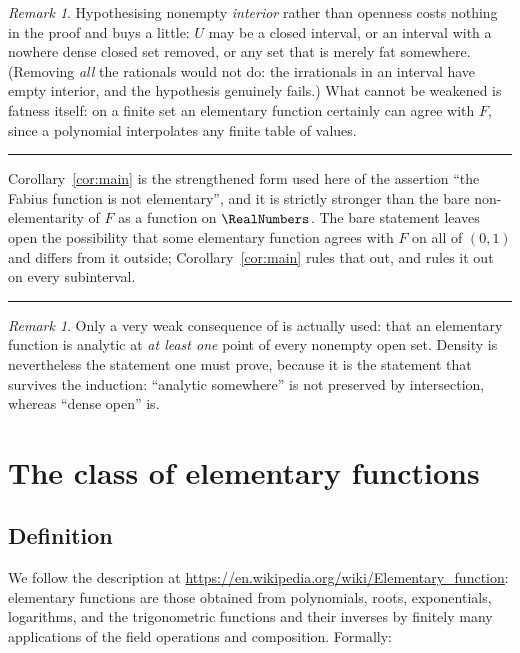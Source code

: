 \documentclass[11pt,oneside]{article}
\theoremstyle{definition}
\theoremstyle{remark}
\newtheorem{remark}[theorem]{Remark}
\newenvironment{boxedremark}{%
  \par\smallskip\noindent\begin{center}\begin{minipage}{0.94\textwidth}%
  \color{black}\hrule\vspace{0.6em}\small
}{%
  \vspace{0.6em}\hrule\end{minipage}\end{center}\smallskip
}
\begin{document}
\begin{remark}
Hypothesising nonempty \emph{interior} rather than openness costs nothing in
the proof and buys a little: $U$ may be a closed interval, or an interval with
a nowhere dense closed set removed, or any set that is merely fat somewhere.
(Removing \emph{all} the rationals would not do: the irrationals in an
interval have empty interior, and the hypothesis genuinely fails.)
What cannot be weakened is fatness itself: on a finite set an elementary
function certainly can agree with $F$, since a polynomial interpolates any
finite table of values.
\end{remark}

\begin{boxedremark}
Corollary~\ref{cor:main} is the strengthened form used here of the assertion
``the Fabius function is not elementary'', and it is strictly stronger than the bare
non-elementarity of $F$ as a function on $\RealNumbers$.  The bare statement leaves
open the possibility that some elementary function agrees with $F$ on all of
$(0,1)$ and differs from it outside; Corollary~\ref{cor:main} rules that out, and rules
it out on every subinterval.
\end{boxedremark}

\begin{remark}
Only a very weak consequence of  is actually used: that an
elementary function is analytic at \emph{at least one} point of every nonempty
open set.  Density is nevertheless the statement one must prove, because it is
the statement that survives the induction: ``analytic somewhere'' is not
preserved by intersection, whereas ``dense open'' is.
\end{remark}

\section{The class of elementary functions}\label{sec:elem}

\subsection{Definition}

We follow the description at
\url{https://en.wikipedia.org/wiki/Elementary_function}: elementary functions
are those obtained from polynomials, roots, exponentials, logarithms, and the
trigonometric functions and their inverses by finitely many applications of
the field operations and composition.  Formally:
\end{document}

